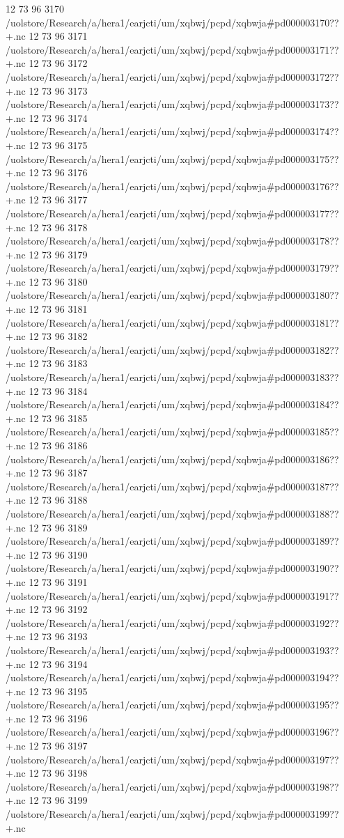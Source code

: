 12 73 96
3170
/uolstore/Research/a/hera1/earjcti/um/xqbwj/pcpd/xqbwja#pd000003170??+.nc
12 73 96
3171
/uolstore/Research/a/hera1/earjcti/um/xqbwj/pcpd/xqbwja#pd000003171??+.nc
12 73 96
3172
/uolstore/Research/a/hera1/earjcti/um/xqbwj/pcpd/xqbwja#pd000003172??+.nc
12 73 96
3173
/uolstore/Research/a/hera1/earjcti/um/xqbwj/pcpd/xqbwja#pd000003173??+.nc
12 73 96
3174
/uolstore/Research/a/hera1/earjcti/um/xqbwj/pcpd/xqbwja#pd000003174??+.nc
12 73 96
3175
/uolstore/Research/a/hera1/earjcti/um/xqbwj/pcpd/xqbwja#pd000003175??+.nc
12 73 96
3176
/uolstore/Research/a/hera1/earjcti/um/xqbwj/pcpd/xqbwja#pd000003176??+.nc
12 73 96
3177
/uolstore/Research/a/hera1/earjcti/um/xqbwj/pcpd/xqbwja#pd000003177??+.nc
12 73 96
3178
/uolstore/Research/a/hera1/earjcti/um/xqbwj/pcpd/xqbwja#pd000003178??+.nc
12 73 96
3179
/uolstore/Research/a/hera1/earjcti/um/xqbwj/pcpd/xqbwja#pd000003179??+.nc
12 73 96
3180
/uolstore/Research/a/hera1/earjcti/um/xqbwj/pcpd/xqbwja#pd000003180??+.nc
12 73 96
3181
/uolstore/Research/a/hera1/earjcti/um/xqbwj/pcpd/xqbwja#pd000003181??+.nc
12 73 96
3182
/uolstore/Research/a/hera1/earjcti/um/xqbwj/pcpd/xqbwja#pd000003182??+.nc
12 73 96
3183
/uolstore/Research/a/hera1/earjcti/um/xqbwj/pcpd/xqbwja#pd000003183??+.nc
12 73 96
3184
/uolstore/Research/a/hera1/earjcti/um/xqbwj/pcpd/xqbwja#pd000003184??+.nc
12 73 96
3185
/uolstore/Research/a/hera1/earjcti/um/xqbwj/pcpd/xqbwja#pd000003185??+.nc
12 73 96
3186
/uolstore/Research/a/hera1/earjcti/um/xqbwj/pcpd/xqbwja#pd000003186??+.nc
12 73 96
3187
/uolstore/Research/a/hera1/earjcti/um/xqbwj/pcpd/xqbwja#pd000003187??+.nc
12 73 96
3188
/uolstore/Research/a/hera1/earjcti/um/xqbwj/pcpd/xqbwja#pd000003188??+.nc
12 73 96
3189
/uolstore/Research/a/hera1/earjcti/um/xqbwj/pcpd/xqbwja#pd000003189??+.nc
12 73 96
3190
/uolstore/Research/a/hera1/earjcti/um/xqbwj/pcpd/xqbwja#pd000003190??+.nc
12 73 96
3191
/uolstore/Research/a/hera1/earjcti/um/xqbwj/pcpd/xqbwja#pd000003191??+.nc
12 73 96
3192
/uolstore/Research/a/hera1/earjcti/um/xqbwj/pcpd/xqbwja#pd000003192??+.nc
12 73 96
3193
/uolstore/Research/a/hera1/earjcti/um/xqbwj/pcpd/xqbwja#pd000003193??+.nc
12 73 96
3194
/uolstore/Research/a/hera1/earjcti/um/xqbwj/pcpd/xqbwja#pd000003194??+.nc
12 73 96
3195
/uolstore/Research/a/hera1/earjcti/um/xqbwj/pcpd/xqbwja#pd000003195??+.nc
12 73 96
3196
/uolstore/Research/a/hera1/earjcti/um/xqbwj/pcpd/xqbwja#pd000003196??+.nc
12 73 96
3197
/uolstore/Research/a/hera1/earjcti/um/xqbwj/pcpd/xqbwja#pd000003197??+.nc
12 73 96
3198
/uolstore/Research/a/hera1/earjcti/um/xqbwj/pcpd/xqbwja#pd000003198??+.nc
12 73 96
3199
/uolstore/Research/a/hera1/earjcti/um/xqbwj/pcpd/xqbwja#pd000003199??+.nc
